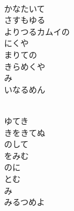 \documentclass[10pt,b5j]{tarticle} %
\begin{document}
\vspace{1.5em} %
\newcommand{\linespace}{0.5em} %
\newcommand{\blocksize}{0.5\hsize} %
\newcommand{\itemmargin}{3em} %
\begin{enumerate} %
    \setlength{\itemindent}{\itemmargin} %
    \begin{minipage}[c]{\blocksize}
    
        \vspace{\linespace}
        \item~\\
        かなたいて\\
        さすもゆる\\
        よりつるカムイの\\
        にくや\\
        まりての\\
        きらめくや\\
        み\\
        いなるめん
        
    \end{minipage}
    \begin{minipage}[c]{\blocksize}
        
        \vspace{\linespace}
        \item~\\
        ゆてき\\
        きをきてぬ\\
        のして\\
        をみむ\\
        のに\\
        とむ\\
        み\\
        みるつめよ
        
    \end{minipage}
    \begin{minipage}[c]{\blocksize}
        

\end{minipage}
\end{enumerate}
\end{document}
